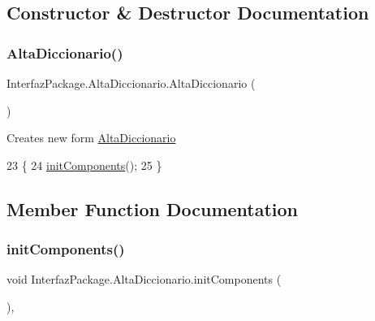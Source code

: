 \subsection{Constructor \& Destructor Documentation}
\mbox{\label{class_interfaz_package_1_1_alta_diccionario_aca3c4675d4f19e6226268ada6f573ae3}} 
\subsubsection{\texorpdfstring{Alta\+Diccionario()}{AltaDiccionario()}}
{\footnotesize\ttfamily Interfaz\+Package.\+Alta\+Diccionario.\+Alta\+Diccionario (\begin{DoxyParamCaption}{ }\end{DoxyParamCaption})\hspace{0.3cm}{\ttfamily [inline]}}

Creates new form \mbox{\hyperlink{class_interfaz_package_1_1_alta_diccionario}{Alta\+Diccionario}} 
\begin{DoxyCode}
23                              \{
24         \mbox{\hyperlink{class_interfaz_package_1_1_alta_diccionario_aad2d413b49e8cc72fe8cd13c3dd82416}{initComponents}}();
25     \}
\end{DoxyCode}


\subsection{Member Function Documentation}
\mbox{\label{class_interfaz_package_1_1_alta_diccionario_aad2d413b49e8cc72fe8cd13c3dd82416}} 
\subsubsection{\texorpdfstring{init\+Components()}{initComponents()}}
{\footnotesize\ttfamily void Interfaz\+Package.\+Alta\+Diccionario.\+init\+Components (\begin{DoxyParamCaption}{ }\end{DoxyParamCaption})\hspace{0.3cm}{\ttfamily [inline]}, {\ttfamily [private]}}

